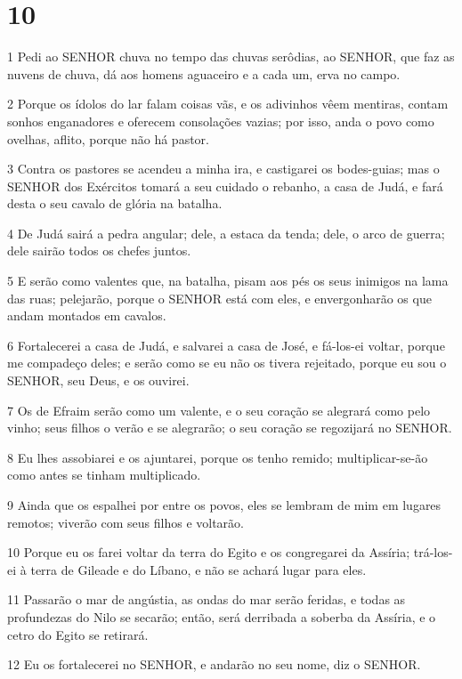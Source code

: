 \chapter{10}

\par 1 Pedi ao SENHOR chuva no tempo das chuvas serôdias, ao SENHOR, que faz as nuvens de chuva, dá aos homens aguaceiro e a cada um, erva no campo.
\par 2 Porque os ídolos do lar falam coisas vãs, e os adivinhos vêem mentiras, contam sonhos enganadores e oferecem consolações vazias; por isso, anda o povo como ovelhas, aflito, porque não há pastor.
\par 3 Contra os pastores se acendeu a minha ira, e castigarei os bodes-guias; mas o SENHOR dos Exércitos tomará a seu cuidado o rebanho, a casa de Judá, e fará desta o seu cavalo de glória na batalha.
\par 4 De Judá sairá a pedra angular; dele, a estaca da tenda; dele, o arco de guerra; dele sairão todos os chefes juntos.
\par 5 E serão como valentes que, na batalha, pisam aos pés os seus inimigos na lama das ruas; pelejarão, porque o SENHOR está com eles, e envergonharão os que andam montados em cavalos.
\par 6 Fortalecerei a casa de Judá, e salvarei a casa de José, e fá-los-ei voltar, porque me compadeço deles; e serão como se eu não os tivera rejeitado, porque eu sou o SENHOR, seu Deus, e os ouvirei.
\par 7 Os de Efraim serão como um valente, e o seu coração se alegrará como pelo vinho; seus filhos o verão e se alegrarão; o seu coração se regozijará no SENHOR.
\par 8 Eu lhes assobiarei e os ajuntarei, porque os tenho remido; multiplicar-se-ão como antes se tinham multiplicado.
\par 9 Ainda que os espalhei por entre os povos, eles se lembram de mim em lugares remotos; viverão com seus filhos e voltarão.
\par 10 Porque eu os farei voltar da terra do Egito e os congregarei da Assíria; trá-los-ei à terra de Gileade e do Líbano, e não se achará lugar para eles.
\par 11 Passarão o mar de angústia, as ondas do mar serão feridas, e todas as profundezas do Nilo se secarão; então, será derribada a soberba da Assíria, e o cetro do Egito se retirará.
\par 12 Eu os fortalecerei no SENHOR, e andarão no seu nome, diz o SENHOR.


